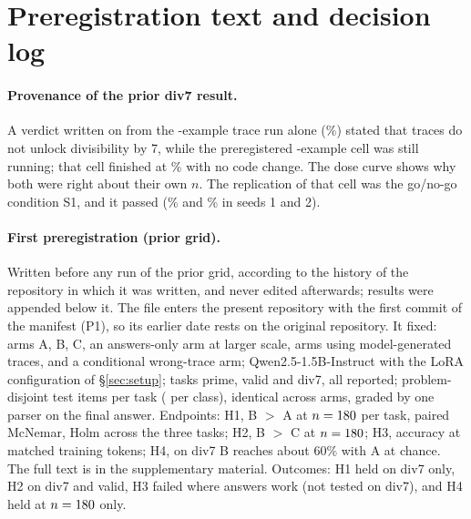 \documentclass{article}
\theoremstyle{definition}
\begin{document}
\section{Preregistration text and decision log}
\label{app:prereg}
\paragraph{Provenance of the prior div7 result.} A verdict written on \priorVerdictDate{} from the \nTrainSmall-example trace run alone (\divsevenBsmall\%) stated that traces do not unlock divisibility by 7, while the preregistered \nTrain-example cell was still running; that cell finished at \divsevenBsZero\% with no code change. The dose curve shows why both were right about their own $n$. The replication of that cell was the go/no-go condition S1, and it passed (\divsevenBsOne\% and \divsevenBsTwo\% in seeds 1 and 2).

\paragraph{First preregistration (prior grid).} Written before any run of the prior grid, according to the history of the repository in which it was written, and never edited afterwards; results were appended below it. The file enters the present repository with the first commit of the manifest (P1), so its earlier date rests on the original repository. It fixed: arms A, B, C, an answers-only arm at larger scale, arms using model-generated traces, and a conditional wrong-trace arm; Qwen2.5-1.5B-Instruct with the LoRA configuration of \S\ref{sec:setup}; tasks prime, valid and div7, all reported; \nTest{} problem-disjoint test items per task (\nTestClass{} per class), identical across arms, graded by one parser on the final answer. Endpoints: H1, B $>$ A at $n=180$ per task, paired McNemar, Holm across the three tasks; H2, B $>$ C at $n=180$; H3, accuracy at matched training tokens; H4, on div7 B reaches about 60\% with A at chance. The full text is in the supplementary material. Outcomes: H1 held on div7 only, H2 on div7 and valid, H3 failed where answers work (not tested on div7), and H4 held at $n=180$ only.
\end{document}
